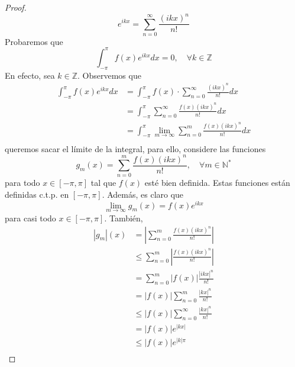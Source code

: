 \documentclass[12pt]{report}
\newcounter{it}
\theoremstyle{largebreak}
\newcommand\abs[1]{\ensuremath{\left|#1\right|}}
\begin{document}
\begin{proof}
        \begin{equation*}
            e^{ ikx}=\sum_{ n=0}^\infty\frac{(ikx)^n}{n!}
        \end{equation*}
        Probaremos que
        \begin{equation*}
            \int_{-\pi}^\pi f(x)e^{ ikx}dx=0,\quad\forall k\in\mathbb{Z}
        \end{equation*}
        En efecto, sea $k\in\mathbb{Z}$. Observemos que
        \begin{equation*}
            \begin{split}
                \int_{-\pi}^\pi f(x)e^{ ikx}dx&=\int_{-\pi}^\pi f(x)\cdot\sum_{ n=0}^\infty\frac{(ikx)^n}{n!} dx\\
                &=\int_{-\pi}^\pi\sum_{ n=0}^\infty\frac{f(x)(ikx)^n}{n!} dx\\
                &=\int_{-\pi}^\pi\lim_{ m\rightarrow\infty} \sum_{ n=0}^m\frac{f(x)(ikx)^n}{n!} dx\\
            \end{split}
        \end{equation*}
        queremos sacar el límite de la integral, para ello, considere las funciones
        \begin{equation*}
            g_m(x)=\sum_{ n=0}^m\frac{f(x)(ikx)^n}{n!},\quad\forall m\in\mathbb{N}^*
        \end{equation*}
        para todo $x\in[-\pi,\pi]$ tal que $f(x)$ esté bien definida. Estas funciones están definidas c.t.p. en $[-\pi,\pi]$. Además, es claro que
        \begin{equation*}
            \lim_{ m\rightarrow\infty}g_m(x)=f(x)e^{ ikx}
        \end{equation*}
        para casi todo $x\in[-\pi,\pi]$. También,
        \begin{equation*}
            \begin{split}
                \abs{g_m}(x)&=\abs{\sum_{ n=0}^m\frac{f(x)(ikx)^n}{n!}}\\
                &\leq\sum_{ n=0}^m\abs{\frac{f(x)(ikx)^n}{n!}}\\
                &=\sum_{ n=0}^m\abs{f(x)}\frac{\abs{ikx}^n}{n!}\\
                &=\abs{f(x)}\sum_{ n=0}^m\frac{\abs{kx}^n}{n!}\\
                &\leq\abs{f(x)}\sum_{ n=0}^\infty\frac{\abs{kx}^n}{n!}\\
                &=\abs{f(x)}e^{\abs{kx}}\\
                &\leq\abs{f(x)}e^{\abs{k}\pi}\\

\end{split}
\end{equation*}
\end{proof}
\end{document}
